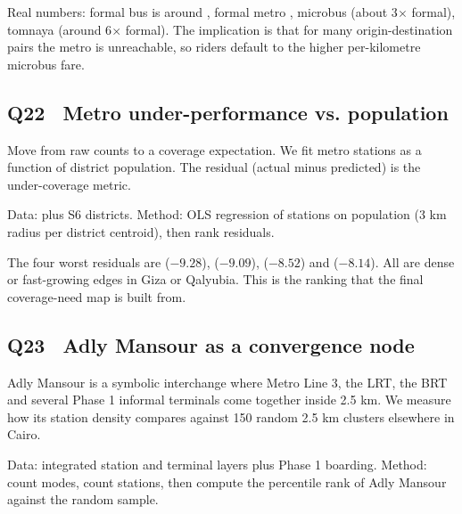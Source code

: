 
Real numbers: formal bus is around , formal metro
, microbus  (about 3$\times$ formal),
tomnaya  (around 6$\times$ formal). The implication
is that for many origin-destination pairs the metro is unreachable, so
riders default to the higher per-kilometre microbus fare.

\subsection{Q22 \textbullet\ Metro under-performance vs. population}

Move from raw counts to a coverage expectation. We fit metro stations
as a function of district population. The residual (actual minus
predicted) is the under-coverage metric.

Data:  plus S6 districts. Method: OLS
regression of stations on population (3 km radius per district
centroid), then rank residuals.


The four worst residuals are  ($-9.28$),
 ($-9.09$), 
($-8.52$) and  ($-8.14$). All are dense or
fast-growing edges in Giza or Qalyubia. This is the ranking that the
final coverage-need map is built from.

\subsection{Q23 \textbullet\ Adly Mansour as a convergence node}

Adly Mansour is a symbolic interchange where Metro Line 3, the LRT,
the BRT and several Phase 1 informal terminals come together inside
2.5 km. We measure how its station density compares against 150 random
2.5 km clusters elsewhere in Cairo.

Data: integrated station and terminal layers plus Phase 1 boarding.
Method: count modes, count stations, then compute the percentile rank
of Adly Mansour against the random sample.


